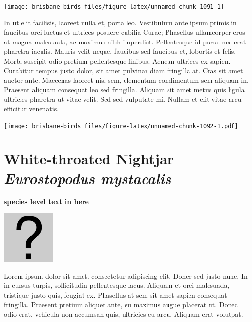 \documentclass[]{book}
\let\origfigure\figure
\let\endorigfigure\endfigure
\renewenvironment{figure}[1][2] {
  \expandafter\origfigure\expandafter[H]
} {
  \endorigfigure
}
\begin{document}
\begin{figure}
\texttt{[image: brisbane-birds\_files/figure-latex/unnamed-chunk-1091-1]} \caption{insert figure caption}\label{fig:unnamed-chunk-1091}
\end{figure}

In ut elit facilisis, laoreet nulla et, porta leo. Vestibulum ante ipsum
primis in faucibus orci luctus et ultrices posuere cubilia Curae;
Phasellus ullamcorper eros at magna malesuada, ac maximus nibh
imperdiet. Pellentesque id purus nec erat pharetra iaculis. Mauris velit
neque, faucibus sed faucibus et, lobortis et felis. Morbi suscipit odio
pretium pellentesque finibus. Aenean ultrices ex sapien. Curabitur
tempus justo dolor, sit amet pulvinar diam fringilla at. Cras sit amet
auctor ante. Maecenas laoreet nisi sem, elementum condimentum sem
aliquam in. Praesent aliquam consequat leo sed fringilla. Aliquam sit
amet metus quis ligula ultricies pharetra ut vitae velit. Sed sed
vulputate mi. Nullam et elit vitae arcu efficitur venenatis.

\begin{figure}
\centering
\texttt{[image: brisbane-birds\_files/figure-latex/unnamed-chunk-1092-1.pdf]}
\caption{\label{fig:unnamed-chunk-1092}insert figure caption}
\end{figure}

\section{\texorpdfstring{White-throated Nightjar \emph{Eurostopodus
mystacalis}}{White-throated Nightjar Eurostopodus mystacalis}}\label{white-throated-nightjar-eurostopodus-mystacalis}

\textbf{species level text in here}

\begin{figure}
\centering
\includegraphics{assets/missing.png}
\caption{No image for species}
\end{figure}

Lorem ipsum dolor sit amet, consectetur adipiscing elit. Donec sed justo
nunc. In in cursus turpis, sollicitudin pellentesque lacus. Aliquam et
orci malesuada, tristique justo quis, feugiat ex. Phasellus at sem sit
amet sapien consequat fringilla. Praesent pretium aliquet ante, eu
maximus augue placerat ut. Donec odio erat, vehicula non accumsan quis,
ultricies eu arcu. Aliquam erat volutpat.
\end{document}
